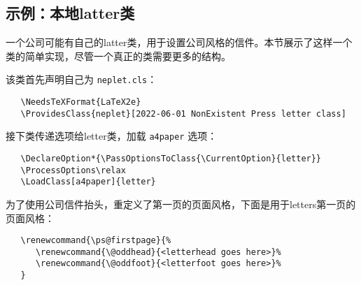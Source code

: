 \documentclass[12pt]{ltxguide}
\begin{document}
\subsection{示例：本地latter类}
一个公司可能有自己的latter类，用于设置公司风格的信件。本节展示了这样一个类的简单实现，尽管一个真正的类需要更多的结构。

该类首先声明自己为 \verb|neplet.cls|：
\begin{verbatim}
   \NeedsTeXFormat{LaTeX2e}
   \ProvidesClass{neplet}[2022-06-01 NonExistent Press letter class]
\end{verbatim}
接下类传递选项给letter类，加载 \verb|a4paper| 选项：
\begin{verbatim}
   \DeclareOption*{\PassOptionsToClass{\CurrentOption}{letter}}
   \ProcessOptions\relax
   \LoadClass[a4paper]{letter}
\end{verbatim}
为了使用公司信件抬头，重定义了第一页的页面风格，下面是用于letters第一页的页面风格：
\begin{verbatim}
   \renewcommand{\ps@firstpage}{%
      \renewcommand{\@oddhead}{<letterhead goes here>}%
      \renewcommand{\@oddfoot}{<letterfoot goes here>}%
   }
\end{verbatim}
\end{document}
